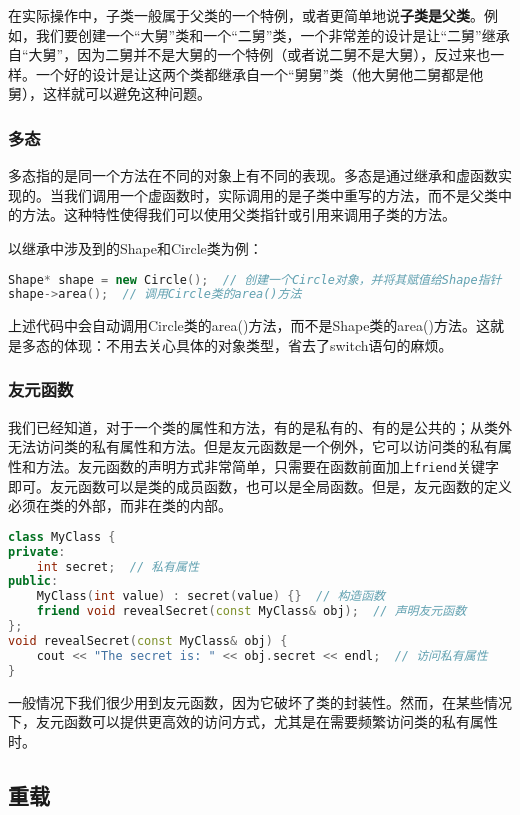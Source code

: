 在实际操作中，子类一般属于父类的一个特例，或者更简单地说\textbf{子类是父类}。例如，我们要创建一个“大舅”类和一个“二舅”类，一个非常差的设计是让“二舅”继承自“大舅”，因为二舅并不是大舅的一个特例（或者说二舅不是大舅），反过来也一样。一个好的设计是让这两个类都继承自一个“舅舅”类（他大舅他二舅都是他舅），这样就可以避免这种问题。

\subsubsection{多态}

多态指的是同一个方法在不同的对象上有不同的表现。多态是通过继承和虚函数实现的。当我们调用一个虚函数时，实际调用的是子类中重写的方法，而不是父类中的方法。这种特性使得我们可以使用父类指针或引用来调用子类的方法。

以继承中涉及到的Shape和Circle类为例：
\begin{lstlisting}[language=C++]
Shape* shape = new Circle();  // 创建一个Circle对象，并将其赋值给Shape指针
shape->area();  // 调用Circle类的area()方法
\end{lstlisting}
上述代码中会自动调用Circle类的area()方法，而不是Shape类的area()方法。这就是多态的体现：不用去关心具体的对象类型，省去了switch语句的麻烦。

\subsubsection{友元函数}

我们已经知道，对于一个类的属性和方法，有的是私有的、有的是公共的；从类外无法访问类的私有属性和方法。但是友元函数是一个例外，它可以访问类的私有属性和方法。友元函数的声明方式非常简单，只需要在函数前面加上\texttt{friend}关键字即可。友元函数可以是类的成员函数，也可以是全局函数。但是，友元函数的定义必须在类的外部，而非在类的内部。
\begin{lstlisting}[language=C++]
class MyClass {
private:
    int secret;  // 私有属性
public:
    MyClass(int value) : secret(value) {}  // 构造函数
    friend void revealSecret(const MyClass& obj);  // 声明友元函数
};
void revealSecret(const MyClass& obj) {
    cout << "The secret is: " << obj.secret << endl;  // 访问私有属性
}
\end{lstlisting}

一般情况下我们很少用到友元函数，因为它破坏了类的封装性。然而，在某些情况下，友元函数可以提供更高效的访问方式，尤其是在需要频繁访问类的私有属性时。

\subsection{重载}

